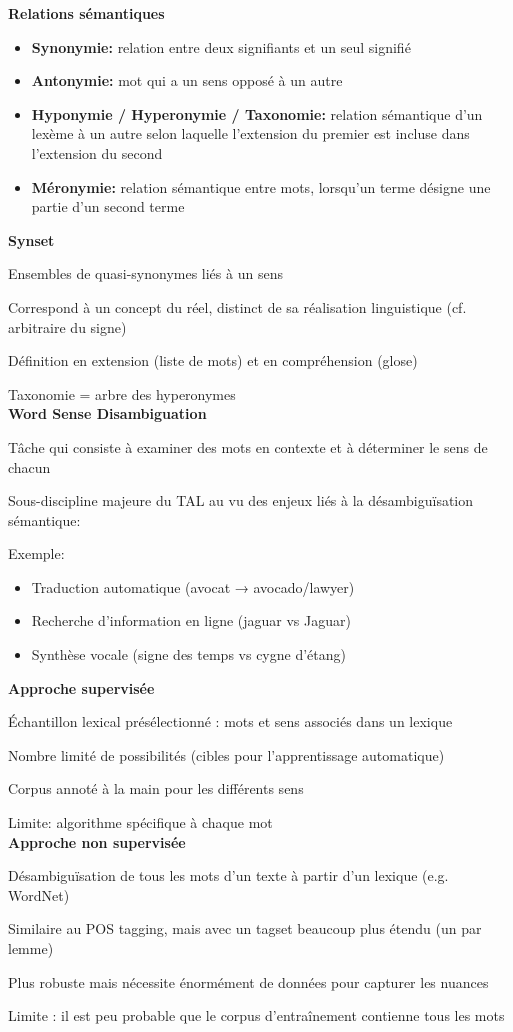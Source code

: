 \textbf{Relations sémantiques}

\begin{itemize}
\item \textbf{Synonymie:} relation entre deux signifiants et un seul signifié
\item \textbf{Antonymie:} mot qui a un sens opposé à un autre
\item \textbf{Hyponymie / Hyperonymie / Taxonomie:} relation sémantique d'un lexème à un autre selon laquelle l'extension du premier est incluse dans l'extension du second
\item \textbf{Méronymie:} relation sémantique entre mots, lorsqu'un terme désigne une partie d'un second terme\\
\end{itemize}

\textbf{Synset}

Ensembles de quasi-synonymes liés à un sens

Correspond à un concept du réel, distinct de sa réalisation linguistique (cf. arbitraire du signe)

Définition en extension (liste de mots) et en compréhension (glose)

Taxonomie = arbre des hyperonymes\\

\textbf{Word Sense Disambiguation}

Tâche qui consiste à examiner des mots en contexte et à déterminer le sens de chacun

Sous-discipline majeure du TAL au vu des enjeux liés à la désambiguïsation sémantique:

Exemple:
\begin{itemize}
    \item Traduction automatique (avocat → avocado/lawyer)
    \item Recherche d'information en ligne (jaguar vs Jaguar)
    \item Synthèse vocale (signe des temps vs cygne d'étang)\\
\end{itemize}

\textbf{Approche supervisée}

Échantillon lexical présélectionné : mots et sens associés dans un lexique

Nombre limité de possibilités (cibles pour l'apprentissage automatique)

Corpus annoté à la main pour les différents sens

Limite: algorithme spécifique à chaque mot\\

\textbf{Approche non supervisée}

Désambiguïsation de tous les mots d'un texte à partir d'un lexique (e.g. WordNet)

Similaire au POS tagging, mais avec un tagset beaucoup plus étendu (un par lemme)

Plus robuste mais nécessite énormément de données pour capturer les nuances

Limite : il est peu probable que le corpus d'entraînement contienne tous les mots\\

